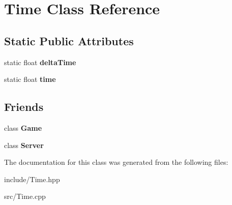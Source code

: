 \hypertarget{class_time}{\section{Time Class Reference}
\label{class_time}
}
\subsection*{Static Public Attributes}
\begin{DoxyCompactItemize}
\item 
\hypertarget{class_time_a35fe30294c847679da506b540f05d593}{static float {\bfseries delta\-Time}}\label{class_time_a35fe30294c847679da506b540f05d593}

\item 
\hypertarget{class_time_ace6e056882b2b2f73b1f8870c8c0dccb}{static float {\bfseries time}}\label{class_time_ace6e056882b2b2f73b1f8870c8c0dccb}

\end{DoxyCompactItemize}
\subsection*{Friends}
\begin{DoxyCompactItemize}
\item 
\hypertarget{class_time_aa2fab026580d6f14280c2ffb8063a314}{class {\bfseries Game}}\label{class_time_aa2fab026580d6f14280c2ffb8063a314}

\item 
\hypertarget{class_time_ac2055578ac48afabe5af487878450f68}{class {\bfseries Server}}\label{class_time_ac2055578ac48afabe5af487878450f68}

\end{DoxyCompactItemize}


The documentation for this class was generated from the following files\-:\begin{DoxyCompactItemize}
\item 
include/Time.\-hpp\item 
src/Time.\-cpp\end{DoxyCompactItemize}
